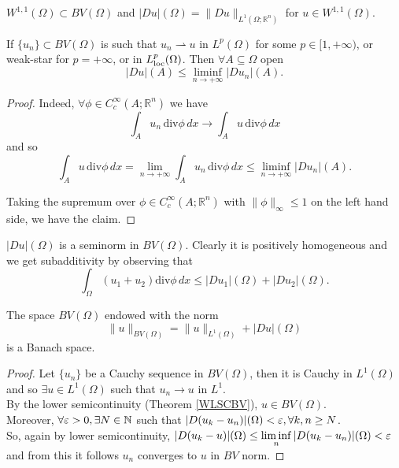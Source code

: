 \begin{remark} $W^{1,1}(\Omega) \subset BV(\Omega)$ and $|Du|(\Omega) = \|Du\|_{L^{1}(\Omega; \mathbb{R}^{n})}$ for $u \in W^{1,1}(\Omega)$.
\end{remark}



\begin{theorem} \label{WLSCBV} If $\{u_{n}\} \subset BV(\Omega)$ is such that $u_{n} \rightharpoonup u$ in $L^{p}(\Omega)$ for some $p \in [1, +\infty)$, or weak-star for $p = +\infty$, or in $L^{p}_{\rm loc}(\Omega)$. Then $\forall A \subseteq \Omega$ open
\[ |Du|(A) \le \liminf\limits_{n \to +\infty} |Du_{n}|(A). \]
\end{theorem}
\begin{proof} Indeed, $\forall \phi \in C_{c}^{\infty}(A; \mathbb{R}^{n})$ we have 
\[ \int_{A} u_{n}\, \mathrm{div}\phi\, dx \to \int_{A} u\, \mathrm{div}\phi\, dx \]
and so
\[ \int_{A} u\, \mathrm{div}\phi\, dx = \lim_{n \to +\infty} \int_{A} u_{n}\, \mathrm{div}\phi\, dx \le \liminf\limits_{n \to +\infty} |Du_{n}|(A). \]

Taking the supremum over $\phi \in C_{c}^{\infty}(A; \mathbb{R}^{n})$ with $\|\phi\|_{\infty} \le 1$ on the left hand side, we have the claim. 
\end{proof}



\begin{remark} $|Du|(\Omega)$ is a seminorm in $BV(\Omega)$. Clearly it is positively homogeneous and we get subadditivity by observing that 
\[ \int_{\Omega} (u_{1} + u_{2})\mathrm{div}\phi \, dx \le |Du_{1}|(\Omega) + |Du_{2}|(\Omega). \]
\end{remark}

\begin{theorem} The space $BV(\Omega)$ endowed with the norm 
\[ \|u\|_{BV(\Omega)} = \|u\|_{L^{1}(\Omega)} + |Du|(\Omega)\]
is a Banach space.
\end{theorem}

\begin{proof} Let $\{u_{n}\}$ be a Cauchy sequence in $BV(\Omega)$, then it is Cauchy in $L^{1}(\Omega)$ and so $\exists u \in L^{1}(\Omega)$ such that $u_{n} \to u$ in $L^{1}$. 
\\
By the lower semicontinuity (Theorem \ref{WLSCBV}), $u \in BV(\Omega)$.
\\
Moreover, $\forall \varepsilon > 0, \exists N \in \mathbb{N}$ such that $|D(u_{k} - u_{n})|(\Omega) < \varepsilon, \forall k, n \ge N$.
\\    
So, again by lower semicontinuity, $|D(u_{k} - u)|(\Omega) \le \liminf\limits_{n} |D(u_{k} - u_{n})|(\Omega) < \varepsilon$ and from this it follows $u_{n}$ converges to $u$ in $BV$ norm.       
\end{proof}

